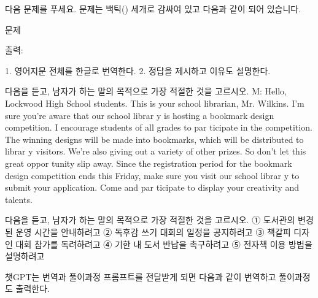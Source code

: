 \documentclass[
  letterpaper,
]{book}
\newenvironment{Shaded}{\begin{snugshade}}{\end{snugshade}}
\newcommand{\NormalTok}[1]{\textcolor[rgb]{0.00,0.23,0.31}{#1}}
\begin{document}
\begin{Shaded}
\begin{Highlighting}[]
\NormalTok{다음 문제를 푸세요. 문제는 백틱(\textasciigrave{}) 세개로 감싸여 있고 다음과 같이 되어 있습니다.}

\NormalTok{\textasciigrave{}\textasciigrave{}\textasciigrave{} }
\NormalTok{문제}
\NormalTok{\textasciigrave{}\textasciigrave{}\textasciigrave{}}

\NormalTok{출력:}

\NormalTok{1. 영어지문 전체를 한글로 번역한다.}
\NormalTok{2. 정답을 제시하고 이유도 설명한다.}

\NormalTok{\textasciigrave{}\textasciigrave{}\textasciigrave{}}
\NormalTok{다음을 듣고, 남자가 하는 말의 목적으로 가장 적절한 것을 고르시오.}
\NormalTok{M: Hello, Lockwood High School students. This is your school librarian, Mr. Wilkins. I’m sure you’re aware that our school librar y is hosting a bookmark design competition. I encourage students of all grades to par ticipate in the competition. The winning designs will be made into bookmarks, which will be distributed to librar y visitors. We’re also giving out a variety of other prizes. So don’t let this great oppor tunity slip away. Since the registration period for the bookmark design competition ends this Friday, make sure you visit our school librar y to submit your application. Come and par ticipate to display your creativity and talents.}

\NormalTok{다음을 듣고, 남자가 하는 말의 목적으로 가장 적절한 것을 고르시오. ① 도서관의 변경된 운영 시간을 안내하려고 ② 독후감 쓰기 대회의 일정을 공지하려고 ③ 책갈피 디자인 대회 참가를 독려하려고 ④ 기한 내 도서 반납을 촉구하려고 ⑤ 전자책 이용 방법을 설명하려고}
\NormalTok{\textasciigrave{}\textasciigrave{}\textasciigrave{}}
\end{Highlighting}
\end{Shaded}

챗GPT는 번역과 풀이과정 프롬프트를 전달받게 되면 다음과 같이 번역하고
풀이과정도 출력한다.
\end{document}
